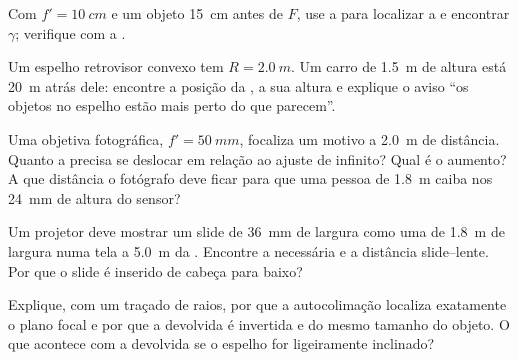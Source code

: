 \begin{exercise}[$\star$]\label{exo:b1:mirrors-thin-lenses:4}
Com $f' = \qty{10}{cm}$ e um objeto \qty{15}{cm} antes de $F$,
use a  para localizar a  e encontrar $\gamma$; verifique com
a .
\end{exercise}

\begin{exercise}[$\star\star$]\label{exo:b1:mirrors-thin-lenses:5}
Um espelho retrovisor convexo tem $R = \qty{2.0}{m}$. Um carro de \qty{1.5}{m}
de altura está \qty{20}{m} atrás dele: encontre a posição da , a sua altura e
explique o aviso ``os objetos no espelho estão mais perto do que parecem''.
\end{exercise}

\begin{exercise}[$\star\star$]\label{exo:b1:mirrors-thin-lenses:6}
Uma objetiva fotográfica, $f' = \qty{50}{mm}$, focaliza um motivo a \qty{2.0}{m}
de distância. Quanto a  precisa se deslocar em relação ao ajuste de infinito? Qual
é o aumento? A que distância o fotógrafo deve ficar para que uma
pessoa de \qty{1.8}{m} caiba nos \qty{24}{mm} de altura do sensor?
\end{exercise}

\begin{exercise}[$\star\star$]\label{exo:b1:mirrors-thin-lenses:7}
Um projetor deve mostrar um slide de \qty{36}{mm} de largura como uma  de \qty{1.8}{m}
de largura numa tela a \qty{5.0}{m} da . Encontre a 
necessária e a distância slide--lente. Por que o slide é inserido de cabeça
para baixo?
\end{exercise}

\begin{exercise}[$\star\star$]\label{exo:b1:mirrors-thin-lenses:8}
Explique, com um traçado de raios, por que a autocolimação localiza exatamente o plano
focal e por que a  devolvida é invertida e do mesmo tamanho
do objeto. O que acontece com a  devolvida se o espelho for
ligeiramente inclinado?
\end{exercise}

